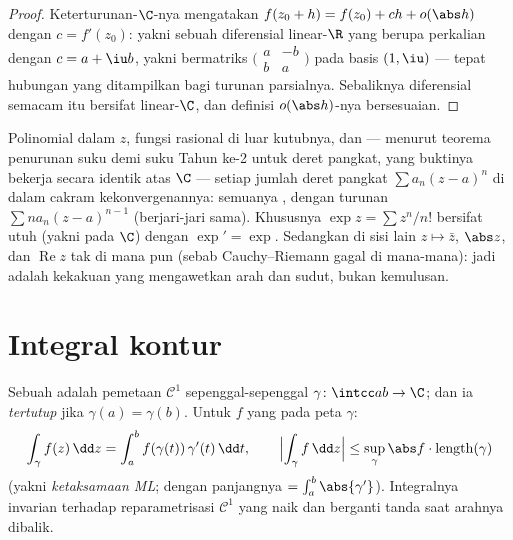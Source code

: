 \begin{proof}
Keterturunan-$\C$-nya mengatakan $f(z_0 + h) = f(z_0) + ch +
o(\abs h)$ dengan $c = f'(z_0)$: yakni sebuah diferensial linear-$\R$
yang berupa perkalian dengan $c = a + \iu b$, yakni bermatriks
$\bigl(\begin{smallmatrix} a & -b\\ b & a
\end{smallmatrix}\bigr)$ pada basis $(1, \iu)$ --- tepat
hubungan yang ditampilkan bagi turunan parsialnya. Sebaliknya diferensial
semacam itu bersifat linear-$\C$, dan definisi $o(\abs h)$-nya
bersesuaian.
\end{proof}

\begin{example}\label{ex:b3:holomorphic:examples}
Polinomial dalam $z$, fungsi rasional di luar kutubnya, dan
--- menurut teorema penurunan suku demi suku Tahun ke-2 untuk deret
pangkat, yang buktinya bekerja secara identik atas $\C$ --- setiap jumlah
deret pangkat $\sum a_n(z - a)^n$ di dalam cakram
kekonvergenannya: semuanya , dengan turunan $\sum na_n(z -
a)^{n-1}$ (berjari-jari sama). Khususnya $\exp z = \sum z^n/n!$
bersifat utuh (yakni  pada $\C$) dengan $\exp' = \exp$. Sedangkan
di sisi lain $z \mapsto \bar z$, $\abs z$, dan $\operatorname{Re}z$
tak  di mana pun (sebab Cauchy--Riemann gagal di mana-mana):
jadi  adalah kekakuan yang mengawetkan arah dan sudut, bukan
kemulusan.
\end{example}

\section{Integral kontur}

\begin{definition}\label{def:b3:holomorphic:contour}
Sebuah \emph{} adalah pemetaan $\mathcal C^1$ sepenggal-sepenggal $\gamma \colon
\intcc ab \to \C$; dan ia \emph{tertutup} jika $\gamma(a) =
\gamma(b)$. Untuk $f$ yang  pada peta
$\gamma$:
\[
\int_\gamma f(z)\,\dd z =
\int_a^b f(\gamma(t))\,\gamma'(t)\,\dd t,
\qquad
\Bigl|\int_\gamma f\,\dd z\Bigr| \leq
\sup_{\gamma}\abs f\cdot\operatorname{length}(\gamma)
\]
(yakni \emph{ketaksamaan ML}; dengan panjangnya $= \int_a^b\abs{\gamma'}$).
Integralnya invarian terhadap reparametrisasi $\mathcal C^1$ yang
naik dan berganti tanda saat arahnya dibalik.
\end{definition}

